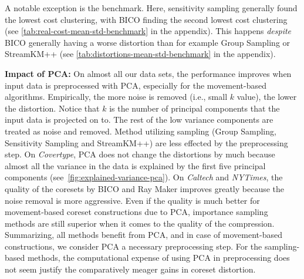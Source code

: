 A notable exception is the benchmark. Here, sensitivity sampling generally found the lowest cost clustering, with BICO finding the second lowest cost clustering (see \cref{tab:real-cost-mean-std-benchmark} in the appendix). This happens \emph{despite} BICO generally having a worse distortion than for example Group Sampling or StreamKM++ (see \cref{tab:distortions-mean-std-benchmark} in the appendix).





{\bf Impact of PCA:}
On almost all our data sets, the performance improves when input data is preprocessed with PCA, especially for the movement-based algorithms. Empirically, the more noise is removed (i.e., small $k$ value), the lower the distortion. Notice that $k$ is the number of principal components that the input data is projected on to. The rest of the low variance components are treated as noise and removed. Method utilizing sampling (Group Sampling, Sensitivity Sampling and StreamKM++) are less effected by the preprocessing step. On \textit{Covertype}, PCA does not change the distortions by much because almost all the variance in the data is explained by the first five principal components (see~\cref{fig:explained-variance-pca}). 
On \textit{Caltech} and \textit{NYTimes}, the quality of the coresets by BICO and Ray Maker improves greatly because the noise removal is more aggressive. Even if the quality is much better for movement-based coreset constructions due to PCA, importance sampling methods are still superior when it comes to the quality of the compression. Summarizing, all methods benefit from PCA, and in case of movement-based constructions, we consider PCA a necessary preprocessing step. For the sampling-based methods, the computational expense of using PCA in preprocessing does not seem justify the comparatively meager gains in coreset distortion.



